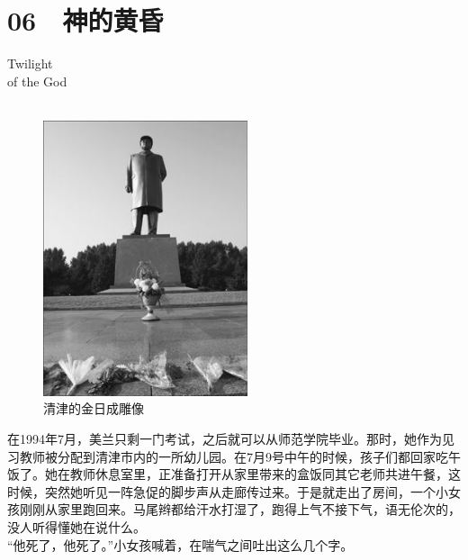 \fancyhead[RO]{{\tiny{\textcolor{Gray}{\FA \ }}}\thepage}
\fancyhead[LE]{{\tiny{\textcolor{Gray}{\FA \ }}}\thepage}
\fancyfoot[LE,RO]{}
\fancyfoot[LO,CE]{}
\fancyfoot[CO,RE]{}
\chapter*{06 {\FA } 神的黄昏}
\vspace{5mm}
\begin{flushright}
	\textcolor{PinYinColor}{\EN \huge{Twilight\\
		of the God\\
	\ \\}}
\end{flushright}
\begin{figure}[!htbp]
	\centering
	\includegraphics[width=6cm]{./Chapters/Images/06.jpg}
	\caption*{清津的金日成雕像}
\end{figure}


在1994年7月，美兰只剩一门考试，之后就可以从师范学院毕业。那时，她作为见习教师被分配到清津市内的一所幼儿园。在7月9号中午的时候，孩子们都回家吃午饭了。她在教师休息室里，正准备打开从家里带来的盒饭同其它老师共进午餐，这时候，突然她听见一阵急促的脚步声从走廊传过来。于是就走出了房间，一个小女孩刚刚从家里跑回来。马尾辫都给汗水打湿了，跑得上气不接下气，语无伦次的，没人听得懂她在说什么。\\

“他死了，他死了。”小女孩喊着，在喘气之间吐出这么几个字。\\

